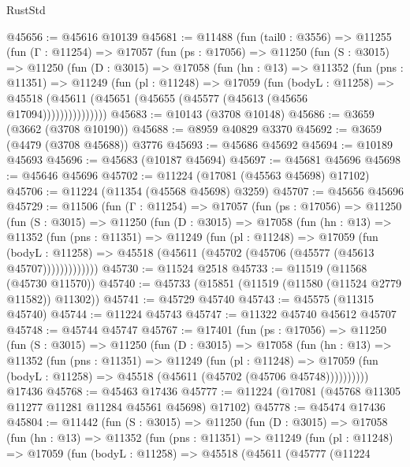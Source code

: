 \begin{lexlean}{RustStd}
\begin{coremodule}
@45656 := @45616 @10139
@45681 := @11488
    (fun (tail0 : @3556) =>
    @11255
      (fun (Γ : @11254) =>
      @17057
        (fun (ps : @17056) =>
        @11250
          (fun (S : @3015) =>
          @11250
            (fun (D : @3015) =>
            @17058
              (fun (hn : @13) =>
              @11352
                (fun (pns : @11351) =>
                @11249
                  (fun (pl : @11248) =>
                  @17059
                    (fun (bodyL : @11258) =>
                    @45518 (@45611 (@45651 (@45655 (@45577 (@45613 (@45656 @17094)))))))))))))))
@45683 := @10143 (@3708 @10148)
@45686 := @3659 (@3662 (@3708 @10190))
@45688 := @8959 @40829 @3370
@45692 := @3659 (@4479 (@3708 @45688)) @3776
@45693 := @45686 @45692
@45694 := @10189 @45693
@45696 := @45683 (@10187 @45694)
@45697 := @45681 @45696
@45698 := @45646 @45696
@45702 := @11224 (@17081 (@45563 @45698) @17102)
@45706 := @11224 (@11354 (@45568 @45698) @3259)
@45707 := @45656 @45696
@45729 := @11506
    (fun (Γ : @11254) =>
    @17057
      (fun (ps : @17056) =>
      @11250
        (fun (S : @3015) =>
        @11250
          (fun (D : @3015) =>
          @17058
            (fun (hn : @13) =>
            @11352
              (fun (pns : @11351) =>
              @11249
                (fun (pl : @11248) =>
                @17059
                  (fun (bodyL : @11258) =>
                  @45518 (@45611 (@45702 (@45706 (@45577 (@45613 @45707)))))))))))))
@45730 := @11524 @2518
@45733 := @11519 (@11568 (@45730 @11570))
@45740 := @45733 (@15851 (@11519 (@11580 (@11524 @2779 @11582)) @11302))
@45741 := @45729 @45740
@45743 := @45575 (@11315 @45740)
@45744 := @11224 @45743
@45747 := @11322 @45740 @45612 @45707
@45748 := @45744 @45747
@45767 := @17401
    (fun (ps : @17056) =>
    @11250
      (fun (S : @3015) =>
      @11250
        (fun (D : @3015) =>
        @17058
          (fun (hn : @13) =>
          @11352
            (fun (pns : @11351) =>
            @11249
              (fun (pl : @11248) =>
              @17059 (fun (bodyL : @11258) => @45518 (@45611 (@45702 (@45706 @45748))))))))))
    @17436
@45768 := @45463 @17436
@45777 := @11224 (@17081 (@45768 @11305 @11277 @11281 @11284 @45561 @45698) @17102)
@45778 := @45474 @17436
@45804 := @11442
    (fun (S : @3015) =>
    @11250
      (fun (D : @3015) =>
      @17058
        (fun (hn : @13) =>
        @11352
          (fun (pns : @11351) =>
          @11249
            (fun (pl : @11248) =>
            @17059
              (fun (bodyL : @11258) =>
              @45518
                (@45611
                  (@45777
                    (@11224

\end{coremodule}
\end{lexlean}
